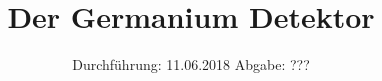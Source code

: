 

\subject{V18}
\title{\texorpdfstring{Der Germanium Detektor }{}}
\date{
	Durchführung: 11.06.2018
	\hspace{4em}
	Abgabe: ???
}


	\maketitle
	\newpage
	\tableofcontents
	\newpage
	
	
	
	
	
	
	\newpage

	\printbibliography

